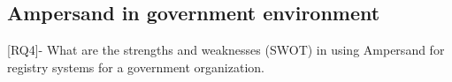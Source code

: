 

\begin{comment}
RQ4 - Wat zijn de sterke en zwakke punten (SWOT) bij het gebruik van Ampersand voor registratiesystemen voor een overheidsorganisatie.
\end{comment}


\subsection{Ampersand in government environment}
[RQ4]- What are the strengths and weaknesses (SWOT) in using Ampersand for registry systems for a government organization.
